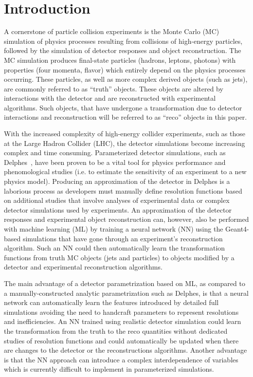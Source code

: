 \documentclass[showpacs,showkeys,preprint,prd,nofootinbib,linenumbers,12pt,superscriptaddress]{revtex4-1}
\begin{document}
\maketitle

\section{Introduction}
\label{sec:intro}
A cornerstone of particle collision experiments is the Monte Carlo (MC) simulation of physics processes resulting from collisions of high-energy particles, followed by the simulation of detector responses and object reconstruction. The MC simulation produces final-state particles (hadrons, leptons, photons) with properties (four momenta, flavor) which entirely depend on the physics processes occurring. These particles, as well as more complex derived objects (such as jets), are commonly referred to as ``truth'' objects. These objects are altered by interactions with the detector and are reconstructed with experimental algorithms. Such objects, that have undergone a transformation due to detector interactions and reconstruction will be referred to as ``reco'' objects in this paper.

With the increased complexity of high-energy collider experiments, such as those at the Large Hadron Collider (LHC), the detector simulations become increasing complex and time consuming. Parameterized detector simulations, such as Delphes~\cite{deFavereau:2013fsa}, have been proven to be a vital tool for physics performance and phenomological studies (i.e. to estimate the sensitivity of an experiment to a new physics model). Producing an approximation of the detector in Delphes is a laborious process as developers must manually define resolution functions based on additional studies that involve analyses of experimental data or complex detector simulations used by experiments. An approximation of the detector responses and experimental object reconstruction can, however, also be performed with machine learning (ML) by training a neural network (NN) using the Geant4-based simulations that have gone through an experiment's reconstruction algorithm. Such an NN could then automatically learn the transformation functions from truth MC objects (jets and particles) to objects modified by a detector and experimental reconstruction algorithms. 

The main advantage of a detector parametrization based on ML, as compared to a manually-constructed analytic parametrization such as Delphes, is that a neural network can automatically learn the features introduced by detailed full simulations avoiding the need to handcraft parameters to represent resolutions and inefficiencies. An NN trained using realistic detector simulation could learn the transformation from the truth to the reco quantities without dedicated studies of resolution functions and could automatically be updated when there are changes to the detector or the reconstructions algorithms. Another advantage is that the NN approach can introduce a complex interdependence of variables which is currently difficult to implement in parameterized simulations.
\end{document}
